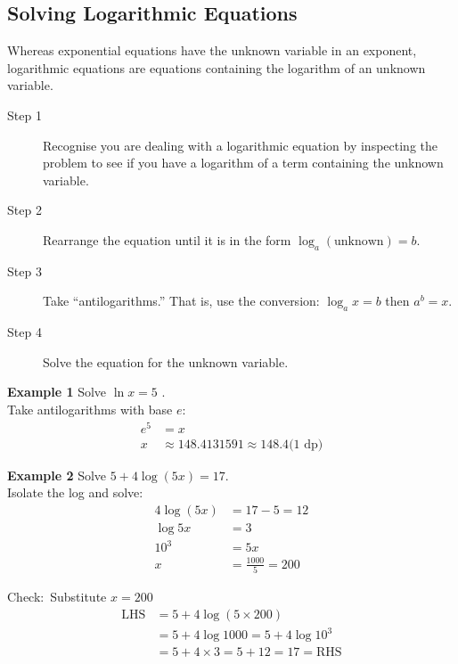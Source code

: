 \subsection*{Solving Logarithmic Equations}
Whereas exponential equations have the unknown variable in an exponent, logarithmic equations are equations containing the logarithm of an unknown variable. 
\begin{tcolorbox}
\begin{description}
	\item [Step 1] Recognise you are dealing with a logarithmic equation by inspecting the problem to see if you have a logarithm of a term containing the unknown variable. 	
	\item [Step	2] Rearrange the equation until it is in the form $\log _{a} \left (\text{unknown}\right ) =b$. 	
	\item [Step 3] Take	``antilogarithms.'' That is, use the conversion: $\log _{a}x=b$ then $a^b=x$. 	
	\item [Step 4] Solve the equation for the unknown variable.
\end{description}
\end{tcolorbox}


\textbf{Example 1} Solve $\ln  x =5$ .\medskip\\
\solution Take antilogarithms with base $e$:
\begin{align*}e^{5} &  = x \\
x &  \approx 148.4131591 \approx 148.4\text{(1 dp)}\end{align*}

\textbf{Example 2} Solve $5 +4 \log  \left (5 x\right ) =17$.\medskip\\
\solution Isolate the log and solve:
\begin{align*}4 \log  \left (5 x\right ) &  = 17 -5 =12 \\
\log  5 x &  = 3 \\
\text{}10^{3} &  = 5 x \\
x &  = \frac{1000}{5} =200\end{align*}

Check:\ Substitute $x =200$
\begin{align*}\text{LHS} &  = 5 +4 \log  \left (5 \times 200\right ) \\
&  = 5 +4 \log  1000 =5 +4 \log  10^{3} \\
&  = 5 +4 \times 3 =5 +12 =17 =\text{RHS}\end{align*}

